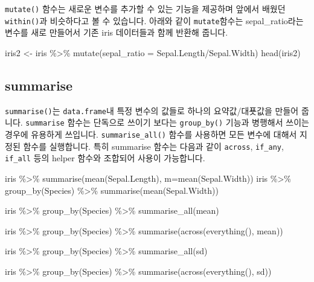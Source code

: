 \documentclass[
]{book}
\newenvironment{Shaded}{\begin{snugshade}}{\end{snugshade}}
\newcommand{\AttributeTok}[1]{\textcolor[rgb]{0.77,0.63,0.00}{#1}}
\newcommand{\FunctionTok}[1]{\textcolor[rgb]{0.00,0.00,0.00}{#1}}
\newcommand{\NormalTok}[1]{#1}
\newcommand{\OtherTok}[1]{\textcolor[rgb]{0.56,0.35,0.01}{#1}}
\newcommand{\SpecialCharTok}[1]{\textcolor[rgb]{0.00,0.00,0.00}{#1}}
\begin{document}
\texttt{mutate()} 함수는 새로운 변수를 추가할 수 있는 기능을 제공하며 앞에서 배웠던 \texttt{within()}과 비슷하다고 볼 수 있습니다. 아래와 같이 \texttt{mutate}함수는 sepal\_ratio라는 변수를 새로 만들어서 기존 iris 데이터들과 함께 반환해 줍니다.

\begin{Shaded}
\begin{Highlighting}[]
\NormalTok{iris2 }\OtherTok{\textless{}{-}}\NormalTok{ iris }\SpecialCharTok{\%\textgreater{}\%} \FunctionTok{mutate}\NormalTok{(}\AttributeTok{sepal\_ratio =}\NormalTok{ Sepal.Length}\SpecialCharTok{/}\NormalTok{Sepal.Width)}
\FunctionTok{head}\NormalTok{(iris2)}
\end{Highlighting}
\end{Shaded}

\hypertarget{summarise}{%
\subsection{summarise}\label{summarise}}

\texttt{summarise()}는 \texttt{data.frame}내 특정 변수의 값들로 하나의 요약값/대푯값을 만들어 줍니다. \texttt{summarise} 함수는 단독으로 쓰이기 보다는 \texttt{group\_by()} 기능과 병행해서 쓰이는 경우에 유용하게 쓰입니다. \texttt{summarise\_all()} 함수를 사용하면 모든 변수에 대해서 지정된 함수를 실행합니다. 특히 summarise 함수는 다음과 같이 \texttt{across}, \texttt{if\_any}, \texttt{if\_all} 등의 helper 함수와 조합되어 사용이 가능합니다.

\begin{Shaded}
\begin{Highlighting}[]
\NormalTok{iris }\SpecialCharTok{\%\textgreater{}\%} \FunctionTok{summarise}\NormalTok{(}\FunctionTok{mean}\NormalTok{(Sepal.Length), }\AttributeTok{m=}\FunctionTok{mean}\NormalTok{(Sepal.Width))}
\NormalTok{iris }\SpecialCharTok{\%\textgreater{}\%} 
  \FunctionTok{group\_by}\NormalTok{(Species) }\SpecialCharTok{\%\textgreater{}\%} 
  \FunctionTok{summarise}\NormalTok{(}\FunctionTok{mean}\NormalTok{(Sepal.Width))}

\NormalTok{iris }\SpecialCharTok{\%\textgreater{}\%} 
  \FunctionTok{group\_by}\NormalTok{(Species) }\SpecialCharTok{\%\textgreater{}\%} 
  \FunctionTok{summarise\_all}\NormalTok{(mean)}

\NormalTok{iris }\SpecialCharTok{\%\textgreater{}\%} 
  \FunctionTok{group\_by}\NormalTok{(Species) }\SpecialCharTok{\%\textgreater{}\%} 
  \FunctionTok{summarise}\NormalTok{(}\FunctionTok{across}\NormalTok{(}\FunctionTok{everything}\NormalTok{(), mean))}


\NormalTok{iris }\SpecialCharTok{\%\textgreater{}\%} 
  \FunctionTok{group\_by}\NormalTok{(Species) }\SpecialCharTok{\%\textgreater{}\%} 
  \FunctionTok{summarise\_all}\NormalTok{(sd)}

\NormalTok{iris }\SpecialCharTok{\%\textgreater{}\%} 
  \FunctionTok{group\_by}\NormalTok{(Species) }\SpecialCharTok{\%\textgreater{}\%} 
  \FunctionTok{summarise}\NormalTok{(}\FunctionTok{across}\NormalTok{(}\FunctionTok{everything}\NormalTok{(), sd))}
\end{Highlighting}
\end{Shaded}
\end{document}
